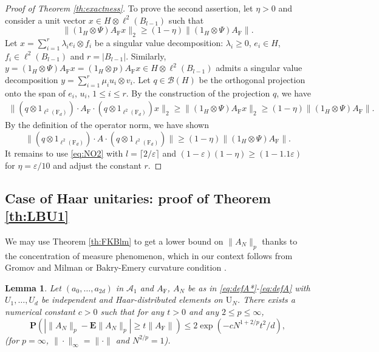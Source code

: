 \documentclass[11pt]{article}
\renewcommand{\star}{{\mathrm{F}}}
\newtheorem{lemma}{Lemma}[section]
\newcommand{\cA}{\mathcal{A}}
\newcommand{\dE}{\mathbf {E}}
\newcommand{\dP}{\mathbf{P}}
\newcommand{\dF}{\mathrm{F}}
\newcommand{\dU}{\mathrm {U}}
\newcommand{\cB}{\mathcal{B}}
\newcommand{\PAR}[1]{{{\left(#1\right)}}} %
\newcommand{\1}{1\!\!{\sf I}}
\newcommand{\veps}{\varepsilon}
\begin{document}
\begin{proof}[Proof of Theorem \ref{th:exactness}]
To prove the second assertion, let $\eta >0$ and
consider a unit vector $x\in H\otimes \ell^2(B_{l-1})$ such that  
$$\|(1_H\otimes \Psi ) A_\star  x\|_2\ge (1-\eta )\|(1_H\otimes \Psi ) A_\star\|.$$
Let $x=\sum_{i=1}^r \lambda_i e_i\otimes f_i$ be a singular value decomposition: $\lambda_i \geq 0$, $e_i \in H$, $f_i \in \ell^2(B_{l-1}) $ and $r = |B_{l-1}|$. Similarly, $y = (1_H \otimes \Psi)A_\star x  = (1_H \otimes p ) A_\star x\in H \otimes \ell^2(B_{l-1})$ admits a singular value decomposition $y = \sum_{i=1}^r \mu_i u_i \otimes v_i$. 
Let $q \in \cB(H)$ be the orthogonal projection onto
the span of $e_i$, $u_i$, $1 \leq i \leq r$. 
By the construction of the projection $q$, we have
\begin{eqnarray*}
\| (q \otimes 1_{\ell^{2}(\dF_d)}) \cdot A_\star \cdot (q \otimes 1_{\ell^{2}(\dF_d)}) x \|_2 \geq  \|(1_H\otimes \Psi ) A_\star  x\|_2 \geq (1-\eta )\|(1_H\otimes \Psi ) A_\star\|.
\end{eqnarray*}
By the definition of the operator norm, we have shown
$$\|(q \otimes 1_{\ell^{2}(\dF_d)}) \cdot A \cdot (q \otimes 1_{\ell^{2}(\dF_d)})\|\ge  (1-\eta)\|(1_H\otimes \Psi ) A_\star\|.$$
It remains to use \eqref{eq:NO2} with $l = \lceil 2/ \veps \rceil$ and $(1-\veps)(1-\eta) \geq (1 - 1.1\veps)$ for $\eta =\veps / 10$ and adjust the constant $r$.
\end{proof}


\subsection{Case of Haar unitaries: proof of Theorem \ref{th:LBU1}}

We may use Theorem \ref{th:FKBlm} to get a lower bound on $\| A_N \|_p$ thanks to the concentration of measure phenomenon, which in our context follows from Gromov and Milman \cite{MR708367} or Bakry-Emery curvature condition \cite{MR889476}. 

\begin{lemma}\label{le: GM}
Let $(a_0,\ldots,a_{2d})$ in $\cA_1$ and $A_\star$, $A_N$ be as in \eqref{eq:defA*}-\eqref{eq:defA} with  $U_1,\ldots, U_d$ be independent and Haar-distributed elements on $\dU_N$. There exists a numerical constant $c >0$ such that for any $t >0$ and any $2 \leq p \leq \infty$,
$$
\dP \PAR{| \| A_N \|_p - \dE  \| A_N \|_p  | \geq t  \| A_\star\|} \leq 2  \exp ( - c N^{1 + 2/p} t^2/ d), 
$$
(for $p = \infty$, $\| \cdot \|_\infty = \| \cdot \|$ and $N^{2/p} = 1$).
\end{lemma}
\end{document}
